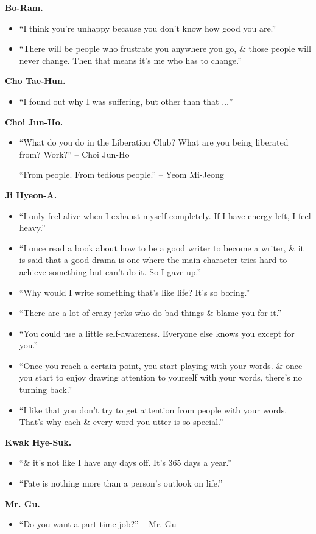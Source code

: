 \documentclass[oneside]{book}
\numberwithin{equation}{section}
\begin{document}
\begin{enumerate}
	\textbf{Bo-Ram.}
	\begin{itemize}
		\item ``I think you're unhappy because you don't know how good you are.''
		\item ``There will be people who frustrate you anywhere you go, \& those people will never change. Then that means it's me who has to change.''
	\end{itemize}
	\textbf{Cho Tae-Hun.}
	\begin{itemize}
		\item ``I found out why I was suffering, but other than that $\ldots$''
	\end{itemize}
	\textbf{Choi Jun-Ho.}
	\begin{itemize}
		\item ``What do you do in the Liberation Club? What are you being liberated from? Work?'' -- Choi Jun-Ho
		
		``From people. From tedious people.'' -- Yeom Mi-Jeong
	\end{itemize}
	\textbf{Ji Hyeon-A.}
	\begin{itemize}
		\item ``I only feel alive when I exhaust myself completely. If I have energy left, I feel heavy.''
		\item ``I once read a book about how to be a good writer to become a writer, \& it is said that a good drama is one where the main character tries hard to achieve something but can't do it. So I gave up.''
		\item ``Why would I write something that's like life? It's so boring.''
		\item ``There are a lot of crazy jerks who do bad things \& blame you for it.''
		\item ``You could use a little self-awareness. Everyone else knows you except for you.''
		\item ``Once you reach a certain point, you start playing with your words. \& once you start to enjoy drawing attention to yourself with your words, there's no turning back.''
		\item ``I like that you don't try to get attention from people with your words. That's why each \& every word you utter is so special.''
	\end{itemize}
	\textbf{Kwak Hye-Suk.}
	\begin{itemize}
		\item ``\& it's not like I have any days off. It's 365 days a year.''
		\item ``Fate is nothing more than a person's outlook on life.''
	\end{itemize}
	\textbf{Mr. Gu.}
	\begin{itemize}
		\item ``Do you want a part-time job?'' -- Mr. Gu
		

\end{itemize}
\end{enumerate}
\end{document}
